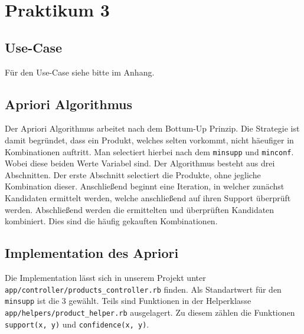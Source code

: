 \section{Praktikum 3}

\subsection{Use-Case}
F\"ur den Use-Case siehe bitte im Anhang.

\subsection{Apriori Algorithmus}
Der Apriori Algorithmus arbeitet nach dem Bottum-Up Prinzip. Die Strategie ist damit begr\"undet, dass ein Produkt, welches selten vorkommt, nicht h\"aeufiger in Kombinationen auftritt. Man selectiert hierbei nach dem \texttt{minsupp} und \texttt{minconf}. Wobei diese beiden Werte Variabel sind. Der Algorithmus besteht aus drei Abschnitten. Der erste Abschnitt selectiert die Produkte, ohne jegliche Kombination dieser. Anschlie{\ss}end beginnt eine Iteration, in welcher zun\"achst Kandidaten ermittelt werden, welche anschlie{\ss}end auf ihren Support \"uberpr\"uft werden. Abschlie{\ss}end werden die ermittelten und \"uberpr\"uften Kandidaten kombiniert. Dies sind die h\"aufig gekauften Kombinationen.

\subsection{Implementation des Apriori}
Die Implementation l\"asst sich in unserem Projekt unter \texttt{app/controller/products\_controller.rb} finden. Als Standartwert f\"ur den \texttt{minsupp} ist die 3 gew\"ahlt. Teils sind Funktionen in der Helperklasse \texttt{app/helpers/product\_helper.rb} ausgelagert. Zu diesem z\"ahlen die Funktionen \texttt{support(x, y)} und \texttt{confidence(x, y)}.
